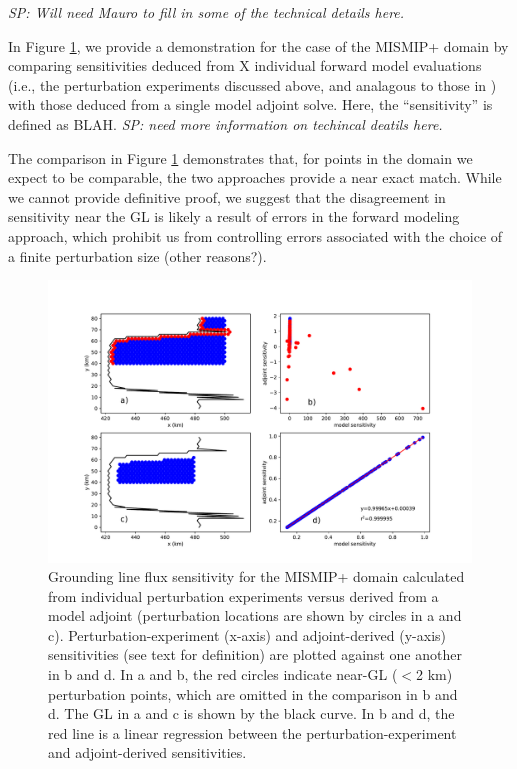 \documentclass[review,oneside]{igs}
\begin{document}
\textit{SP: Will need Mauro to fill in some of the technical details here.}

In Figure \ref{fig9}, we provide a demonstration for the case of the MISMIP+ domain by comparing sensitivities deduced from X individual forward model evaluations (i.e., the perturbation experiments discussed above, and analagous to those in \citet{reese2018}) with those deduced from a single model adjoint solve. Here, the ``sensitivity'' is defined as BLAH. \textit{SP: need more information on techincal deatils here.} 

The comparison in Figure \ref{fig9} demonstrates that, for points in the domain we expect to be comparable, the two approaches provide a near exact match. While we cannot provide definitive proof, we suggest that the disagreement in sensitivity near the GL is likely a result of errors in the forward modeling approach, which prohibit us from controlling errors associated with the choice of a finite perturbation size (other reasons?).

\begin{figure}
	\centering
    \includegraphics[width=1\linewidth]{figs/fig9.pdf}
    \caption{Grounding line flux sensitivity for the MISMIP+ domain calculated from individual perturbation experiments versus derived from a model adjoint (perturbation locations are shown by circles in a and c). Perturbation-experiment (x-axis) and adjoint-derived (y-axis) sensitivities (see text for definition) are plotted against one another in b and d. In a and b, the red circles indicate near-GL ($<$2 km) perturbation points, which are omitted in the comparison in b and d. The GL in a and c is shown by the black curve. In b and d, the red line is a linear regression between the perturbation-experiment and adjoint-derived sensitivities.}
	\label{fig9}
\end{figure}
\end{document}
